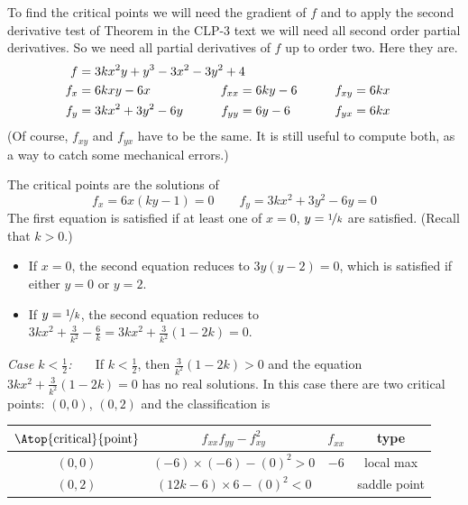 \begin{solution}
To find the critical points we will need the
gradient of $f$ and to apply the second derivative test of 
Theorem  in the CLP-3 text 
we will need all 
second order partial derivatives. So we need all partial derivatives of
$f$ up to order two.
Here they are.
\begin{alignat*}{3}
f&=3kx^2 y + y^3 - 3x^2 - 3y^2 + 4 \hidewidth\\
f_x&=6kxy-6x   & f_{xx}&=6ky-6 \qquad & f_{xy}&= 6kx\\
f_y&=3kx^2+3y^2-6y \qquad & f_{yy}&=6y-6\qquad & f_{yx}&= 6kx
\end{alignat*}
(Of course, $f_{xy}$ and $f_{yx}$ have to be the same. It is still
useful to compute both, as a way to catch some mechanical errors.)

The critical points are the solutions of
\begin{equation*}
f_x=6x(ky-1)=0   \qquad
f_y=3kx^2+3y^2-6y = 0
\end{equation*}
The first equation is satisfied if at least one of $x=0$, $y=\nicefrac{1}{k}$
are satisfied. (Recall that $k>0$.)
\begin{itemize}
\item 
If $x=0$, the second equation reduces to $3y(y-2)=0$, which is
satisfied if either $y=0$ or $y=2$.
\item 
If $y=\nicefrac{1}{k}$, the second equation reduces to 
$3kx^2+\frac{3}{k^2}-\frac{6}{k}=3kx^2+\frac{3}{k^2}(1-2k)=0$.
\end{itemize}

\emph{Case $k<\frac{1}{2}$:\ \ \ }
If $k<\frac{1}{2}$, then $\frac{3}{k^2}(1-2k)>0$ and the equation 
$3kx^2+\frac{3}{k^2}(1-2k)=0$ has no real solutions. In this case 
there are two critical points: $(0,0)$, $(0,2)$ and the classification is
\begin{center}
\renewcommand{\arraystretch}{1.3}
     \begin{tabular}{|c|c|c|c|}
     \hline
    $\Atop{\text{critical}}{\text{point}}$  & $f_{xx}f_{yy}-f_{xy}^2$ & 
                                                          $f_{xx}$ & type \\    
    \hline
     $(0,0)$  & $(-6)\times(-6)-(0)^2> 0$ & $-6$   & local max  \\ \hline
     $(0,2)$  & $(12k-6)\times 6-(0)^2<0$ &   & saddle point \\  \hline
     \end{tabular}
\renewcommand{\arraystretch}{1.0}
\end{center}



\end{solution}
